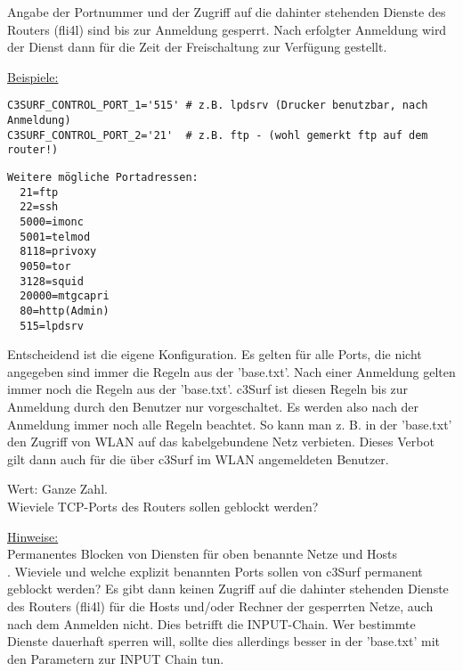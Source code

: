\begin{itemize}
\begin{description}

  Angabe der Portnummer und der Zugriff auf die dahinter stehenden Dienste
  des Routers (fli4l) sind bis zur Anmeldung gesperrt. Nach
  erfolgter Anmeldung wird der Dienst dann für die Zeit der Freischaltung
  zur Verfügung gestellt.

\underline{Beispiele:}
\begin{example}
\begin{verbatim}
C3SURF_CONTROL_PORT_1='515' # z.B. lpdsrv (Drucker benutzbar, nach Anmeldung)
C3SURF_CONTROL_PORT_2='21'  # z.B. ftp - (wohl gemerkt ftp auf dem router!)
\end{verbatim}
\end{example}

\begin{example}
\begin{verbatim}
Weitere mögliche Portadressen:
  21=ftp
  22=ssh
  5000=imonc
  5001=telmod
  8118=privoxy
  9050=tor
  3128=squid
  20000=mtgcapri
  80=http(Admin)
  515=lpdsrv
\end{verbatim}
\end{example}

        Entscheidend ist die eigene Konfiguration. Es gelten für alle Ports,
        die nicht angegeben sind immer die Regeln aus der 'base.txt'.
        Nach einer Anmeldung gelten immer noch die Regeln aus der
        'base.txt'. c3Surf ist diesen Regeln bis zur Anmeldung durch den Benutzer
        nur vorgeschaltet. Es werden also nach der Anmeldung immer noch alle Regeln
        beachtet. So kann man z. B. in der 'base.txt' den Zugriff von WLAN auf das
        kabelgebundene Netz verbieten. Dieses Verbot gilt dann auch für
        die über c3Surf im WLAN angemeldeten Benutzer.



  Wert: Ganze Zahl.\\
  Wieviele TCP-Ports des Routers sollen geblockt werden? 

   \underline{Hinweise:}\\
   Permanentes Blocken von Diensten für oben benannte Netze und Hosts\\
   . Wieviele
   und welche explizit benannten Ports sollen von c3Surf permanent geblockt werden?
   Es gibt dann keinen Zugriff auf die dahinter stehenden Dienste des Routers
   (fli4l) für die Hosts und/oder Rechner der gesperrten Netze, auch nach dem Anmelden
   nicht. Dies betrifft die INPUT-Chain. Wer bestimmte Dienste dauerhaft sperren will, sollte
   dies allerdings besser in der 'base.txt' mit den Parametern zur INPUT Chain tun.


\end{description}
\end{itemize}
